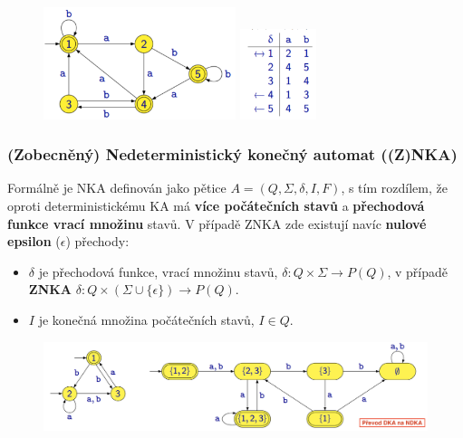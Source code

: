 \begin{figure}[H]
	\centering
	\includegraphics[width=0.5\textwidth]{assets/deter}
	\includegraphics[width=0.2\textwidth]{assets/deter1}
\end{figure}

\subsubsection{(Zobecněný) Nedeterministický konečný automat ((Z)NKA)}
Formálně je NKA definován jako pětice $A = (Q, \Sigma, \delta, I, F)$, s tím rozdílem, že oproti deterministickému KA má \textbf{více počátečních stavů} a \textbf{přechodová funkce vrací množinu} stavů. V případě ZNKA zde existují navíc \textbf{nulové epsilon} ($\epsilon$) přechody:
\begin{itemize}
	\item $\delta$ je přechodová funkce, vrací množinu stavů, $\delta: Q \times \Sigma \rightarrow P(Q)$, v případě \textbf{ZNKA} $\delta: Q \times (\Sigma \cup \{\epsilon\}) \rightarrow P(Q)$.
	\item $I$ je konečná množina počátečních stavů, $I \in Q$.
\end{itemize}

\begin{figure}[H]
\centering
\includegraphics[width=1\textwidth]{assets/nka_na_dka}
\end{figure}

